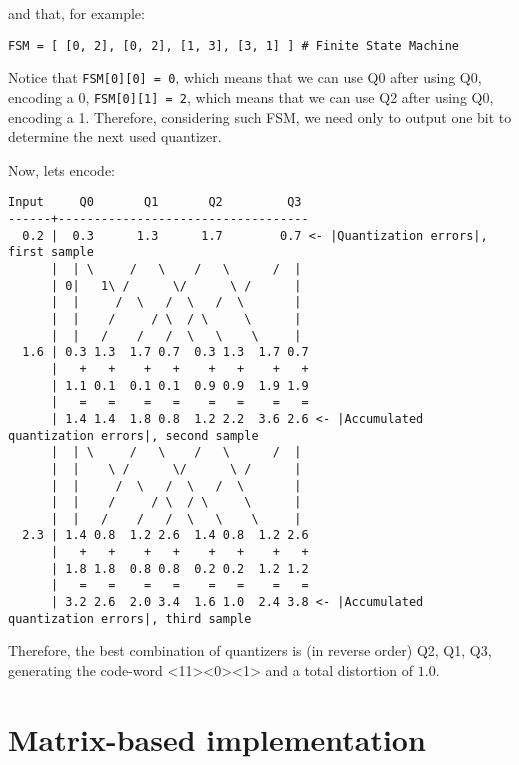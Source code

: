and that, for example:

\begin{verbatim}
FSM = [ [0, 2], [0, 2], [1, 3], [3, 1] ] # Finite State Machine
\end{verbatim}

Notice that \verb|FSM[0][0] = 0|, which means that we can use Q0 after
using Q0, encoding a 0, \verb|FSM[0][1] = 2|, which means that we can
use Q2 after using Q0, encoding a 1. Therefore, considering such FSM,
we need only to output one bit to determine the next used quantizer.

Now, lets encode:

\begin{verbatim}
Input     Q0       Q1       Q2         Q3
------+-----------------------------------
  0.2 |  0.3      1.3      1.7        0.7 <- |Quantization errors|, first sample
      |  | \     /   \    /   \      /  |
      | 0|   1\ /      \/      \ /      |
      |  |     /  \   /  \   /  \       | 
      |  |    /     / \  / \     \      |
      |  |   /    /   /  \   \    \     |
  1.6 | 0.3 1.3  1.7 0.7  0.3 1.3  1.7 0.7
      |   +   +    +   +    +   +    +   +
      | 1.1 0.1  0.1 0.1  0.9 0.9  1.9 1.9
      |   =   =    =   =    =   =    =   =
      | 1.4 1.4  1.8 0.8  1.2 2.2  3.6 2.6 <- |Accumulated quantization errors|, second sample
      |  | \     /   \    /   \      /  |
      |  |    \ /      \/      \ /      |
      |  |     /  \   /  \   /  \       | 
      |  |    /     / \  / \     \      |
      |  |   /    /   /  \   \    \     |
  2.3 | 1.4 0.8  1.2 2.6  1.4 0.8  1.2 2.6 
      |   +   +    +   +    +   +    +   +
      | 1.8 1.8  0.8 0.8  0.2 0.2  1.2 1.2
      |   =   =    =   =    =   =    =   =
      | 3.2 2.6  2.0 3.4  1.6 1.0  2.4 3.8 <- |Accumulated quantization errors|, third sample
\end{verbatim}

Therefore, the best combination of quantizers is (in reverse order)
Q2, Q1, Q3, generating the code-word <11><0><1> and a total distortion
of $1.0$.

\section{Matrix-based implementation}

